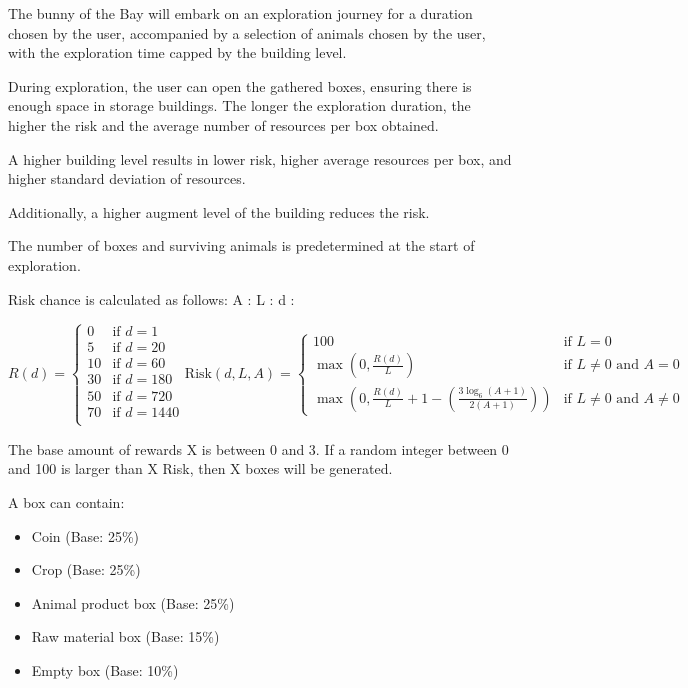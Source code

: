 \documentclass[12pt]{article}
\begin{document}
The bunny of the Bay will embark on an exploration journey for a duration chosen by the user, accompanied by a selection of animals chosen by the user, with the exploration time capped by the building level.

During exploration, the user can open the gathered boxes, ensuring there is enough space in storage buildings. The longer the exploration duration, the higher the risk and the average number of resources per box obtained.

A higher building level results in lower risk, higher average resources per box, and higher standard deviation of resources.

Additionally, a higher augment level of the building reduces the risk.

The number of boxes and surviving animals is predetermined at the start of exploration.

Risk chance is calculated as follows:
A : 
L : 
d : 

\[
R(d) =
\begin{cases}
0 & \text{if } d = 1 \\
5 & \text{if } d = 20 \\
10 & \text{if } d = 60 \\
30 & \text{if } d = 180 \\
50 & \text{if } d = 720 \\
70 & \text{if } d = 1440 \\
\end{cases}

\text{Risk}(d, L, A) =
\begin{cases}
100 & \text{if } L = 0 \\
\max\left(0, \frac{R(d)}{L}\right) & \text{if } L \neq 0 \text{ and } A = 0 \\
\max\left(0, \frac{R(d)}{L} + 1 - \left(\frac{3 \log_6 (A + 1)}{2 (A + 1)}\right)\right) & \text{if } L \neq 0 \text{ and } A \neq 0
\end{cases}
\]

The base amount of rewards X is between 0 and 3. If a random integer between 0 and 100 is larger than X \times Risk, then X boxes will be generated.

A box can contain:

\begin{itemize}
    \item Coin (Base: 25\%)
    \item Crop (Base: 25\%)
    \item Animal product box (Base: 25\%)
    \item Raw material box (Base: 15\%)
    \item Empty box (Base: 10\%)
\end{itemize}
\end{document}
